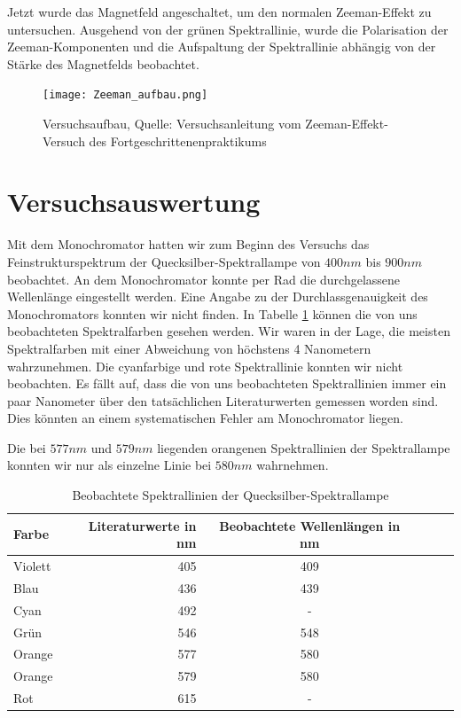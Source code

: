 \documentclass[10pt,a4paper]{article}
\begin{document}
Jetzt wurde das Magnetfeld angeschaltet, um den normalen Zeeman-Effekt zu untersuchen. Ausgehend von der grünen Spektrallinie, wurde die Polarisation der Zeeman-Komponenten und die Aufspaltung der Spektrallinie abhängig von der Stärke des Magnetfelds beobachtet.

\begin{figure}[h]
	\texttt{[image: Zeeman\_aufbau.png]}
	\centering
	\caption{Versuchsaufbau, Quelle: Versuchsanleitung vom Zeeman-Effekt-Versuch des Fortgeschrittenenpraktikums}
	\label{aufbau}
\end{figure}

\section{Versuchsauswertung}


Mit dem Monochromator hatten wir zum Beginn des Versuchs das Feinstrukturspektrum der Quecksilber-Spektrallampe von $400nm$
bis $900nm$ beobachtet. An dem Monochromator konnte per Rad die durchgelassene Wellenlänge eingestellt werden. Eine Angabe zu der Durchlassgenauigkeit des Monochromators konnten wir nicht finden. In Tabelle \ref{spektrum} können die von uns beobachteten Spektralfarben gesehen werden. Wir waren in der Lage, die meisten Spektralfarben mit einer Abweichung von höchstens 4 Nanometern wahrzunehmen. Die cyanfarbige und rote Spektrallinie konnten wir nicht beobachten. Es fällt auf, dass die von uns beobachteten Spektrallinien immer ein paar Nanometer über den tatsächlichen Literaturwerten gemessen worden sind. Dies könnten an einem systematischen Fehler am Monochromator liegen.

Die bei $577nm$ und $579nm$ liegenden orangenen Spektrallinien der Spektrallampe konnten wir nur als einzelne Linie bei $580nm$ wahrnehmen.



\begin{table}[h!]
	\centering
\begin{tabular}{|l|r|c|lrp{16cm}}\hline
	Farbe & Literaturwerte in nm & Beobachtete Wellenlängen in nm\\\hline
	Violett & 405 & 409\\
	Blau & 436 & 439\\
	Cyan & 492 & -\\
	Grün & 546 & 548\\
	Orange & 577 & 580\\
	Orange & 579 & 580\\
	Rot & 615 & -\\\hline
\end{tabular}
	\caption{Beobachtete Spektrallinien der Quecksilber-Spektrallampe}
	\label{spektrum}
	
	
\end{table}\\\\
\\
\\
\end{document}
